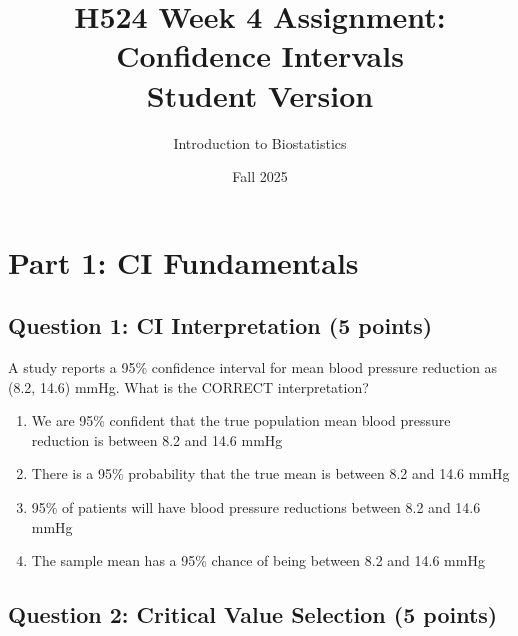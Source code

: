 \documentclass[11pt]{article}
\title{\textbf{\Large H524 Week 4 Assignment: Confidence Intervals}\\
\large Student Version}
\author{Introduction to Biostatistics}
\date{Fall 2025}
\begin{document}
\maketitle

\begin{center}
\end{center}

\vspace{1em}

\section*{Part 1: CI Fundamentals}

\subsection*{Question 1: CI Interpretation (5 points)}

A study reports a 95\% confidence interval for mean blood pressure reduction as (8.2, 14.6) mmHg. What is the CORRECT interpretation?

\begin{enumerate}[label=\alph*)]
\item We are 95\% confident that the true population mean blood pressure reduction is between 8.2 and 14.6 mmHg
\item There is a 95\% probability that the true mean is between 8.2 and 14.6 mmHg
\item 95\% of patients will have blood pressure reductions between 8.2 and 14.6 mmHg
\item The sample mean has a 95\% chance of being between 8.2 and 14.6 mmHg
\end{enumerate}

\subsection*{Question 2: Critical Value Selection (5 points)}
\end{document}
